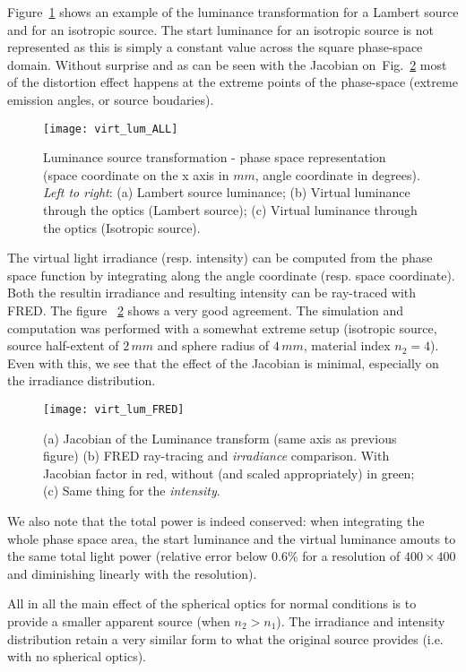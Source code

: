 Figure~\ref{fig:virt_lum_all} shows an example of the luminance transformation for a 
Lambert source and for an isotropic source.
The start luminance for an isotropic source is not represented as this is simply
a constant value across the square phase-space domain.
Without surprise and as can be seen with the Jacobian on~Fig.~\ref{fig:virt_lum_fred}
most of the distortion effect happens at the extreme points of the phase-space (extreme
emission angles, or source boudaries).

\begin{figure}[!htbp]
\centering
\texttt{[image: virt\_lum\_ALL]} 
\caption{Luminance source transformation - phase space representation (space coordinate
on the x axis in $mm$, angle coordinate in degrees). \textit{Left to right}: 
(a) Lambert source luminance; (b) Virtual luminance through the optics (Lambert source);
(c) Virtual luminance through the optics (Isotropic source).}
\label{fig:virt_lum_all}
\end{figure}

The virtual light irradiance (resp. intensity) can be computed from the phase space
function by integrating along the angle coordinate (resp. space coordinate). Both the
resultin irradiance and resulting intensity can be ray-traced with FRED. The figure~
\ref{fig:virt_lum_fred} shows a very good agreement. 
The simulation and computation was performed with a somewhat extreme setup (isotropic
source, source half-extent of $2\,mm$ and sphere radius of $4\,mm$, material index
$n_2 = 4$). Even with this, we see that the effect of the Jacobian is minimal, especially
on the irradiance distribution.

\begin{figure}[!htbp]
\centering
\texttt{[image: virt\_lum\_FRED]} 
\caption{(a) Jacobian of the Luminance transform (same axis as previous figure)
(b) FRED ray-tracing and \textit{irradiance} comparison. 
 With Jacobian factor in red, without (and scaled appropriately) in green; 
 (c) Same thing for the \textit{intensity}. }
\label{fig:virt_lum_fred}
\end{figure}

We also note that the total power is indeed conserved: when integrating the whole phase
space area, the start luminance and the virtual luminance amouts to the same total
light power (relative error below 0.6\% for a resolution of $400\times 400$ and diminishing
linearly with the resolution).

All in all the main effect of the spherical optics for normal conditions is to provide
a smaller apparent source (when $n_2 > n_1$). The irradiance and 
intensity distribution retain a very similar form
to what the original source provides (i.e. with no spherical optics).

